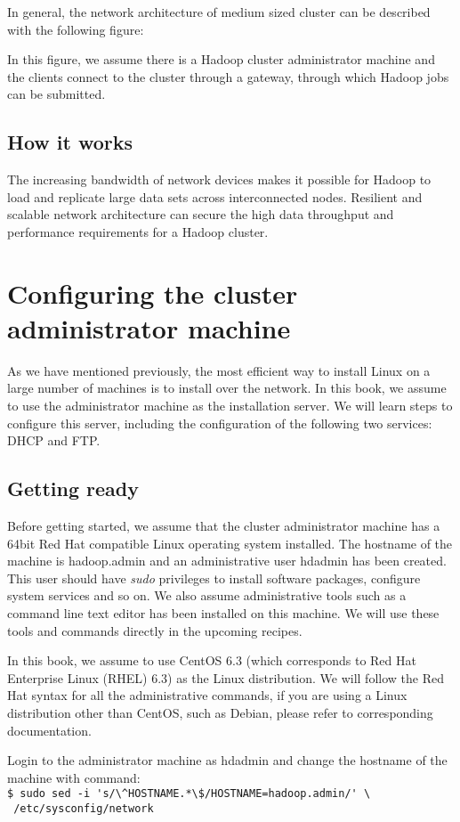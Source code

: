 In general, the network architecture of medium sized cluster can be described with the following figure:

In this figure, we assume there is a Hadoop cluster administrator machine and the clients connect to the cluster through a gateway, through which Hadoop jobs can be submitted.
\subsection*{How it works}
The increasing bandwidth of network devices makes it possible for Hadoop to load and replicate large data sets across interconnected nodes. Resilient and scalable network architecture can secure the high data throughput and performance requirements for a Hadoop cluster.

\section{Configuring the cluster administrator machine}
As we have mentioned previously, the most efficient way to install Linux on a large number of machines is to install over the network. In this book, we assume to use the administrator machine as the installation server. We will learn steps to configure this server, including the configuration of the following two services: DHCP and FTP.

\subsection*{Getting ready}
Before getting started, we assume that the cluster administrator machine has a 64bit Red Hat compatible Linux operating system installed. The hostname of the machine is hadoop.admin and an administrative user hdadmin has been created. This user should have \emph{sudo} privileges to install software packages, configure system services and so on. We also assume administrative tools such as a command line text editor has been installed on this machine. We will use these tools and commands directly in the upcoming recipes.

In this book, we assume to use CentOS 6.3 (which corresponds to Red Hat Enterprise Linux (RHEL) 6.3) as the Linux distribution. We will follow the Red Hat syntax for all the administrative commands, if you are using a Linux distribution other than CentOS, such as Debian, please refer to corresponding documentation.

Login to the administrator machine as hdadmin and change the hostname of the machine with command: \\
\verb|$ sudo sed -i 's/\^HOSTNAME.*\$/HOSTNAME=hadoop.admin/' \| \\
\verb| /etc/sysconfig/network|

